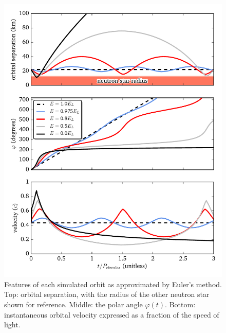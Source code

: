 \documentclass[11pt]{article}
\begin{document}
\begin{figure}[!h]
\centering
\includegraphics[scale=1]{stable_orbit/orbit_parameters.pdf}
\caption{\label{fig:simulated_parameters} Features of each simulated orbit as approximated by Euler's method. Top: orbital separation, with the radius of the other neutron star shown for reference. Middle: the polar angle $\varphi(t)$. Bottom: instantaneous orbital velocity expressed as a fraction of the speed of light.}
\end{figure}
\end{document}

